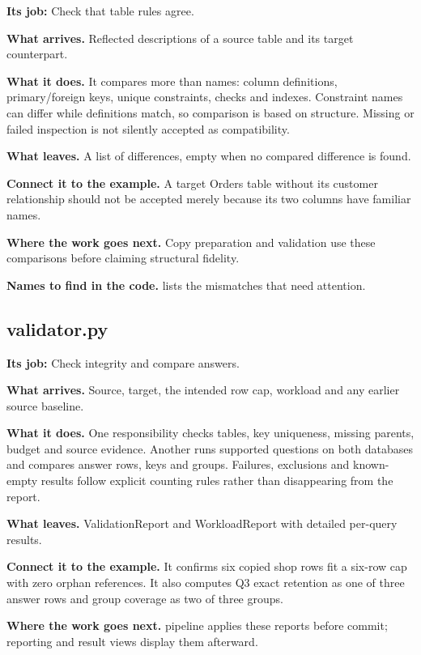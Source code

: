 \textbf{Its job:} Check that table rules agree.

\textbf{What arrives.} Reflected descriptions of a source table and its target counterpart.

\textbf{What it does.} It compares more than names: column definitions, primary/foreign keys, unique constraints, checks and indexes. Constraint names can differ while definitions match, so comparison is based on structure. Missing or failed inspection is not silently accepted as compatibility.

\textbf{What leaves.} A list of differences, empty when no compared difference is found.

\textbf{Connect it to the example.} A target Orders table without its customer relationship should not be accepted merely because its two columns have familiar names.

\textbf{Where the work goes next.} Copy preparation and validation use these comparisons before claiming structural fidelity.

\textbf{Names to find in the code.}  lists the mismatches that need attention.


\subsection{validator.py}

\textbf{Its job:} Check integrity and compare answers.

\textbf{What arrives.} Source, target, the intended row cap, workload and any earlier source baseline.

\textbf{What it does.} One responsibility checks tables, key uniqueness, missing parents, budget and source evidence. Another runs supported questions on both databases and compares answer rows, keys and groups. Failures, exclusions and known-empty results follow explicit counting rules rather than disappearing from the report.

\textbf{What leaves.} ValidationReport and WorkloadReport with detailed per-query results.

\textbf{Connect it to the example.} It confirms six copied shop rows fit a six-row cap with zero orphan references. It also computes Q3 exact retention as one of three answer rows and group coverage as two of three groups.

\textbf{Where the work goes next.} pipeline applies these reports before commit; reporting and result views display them afterward.

